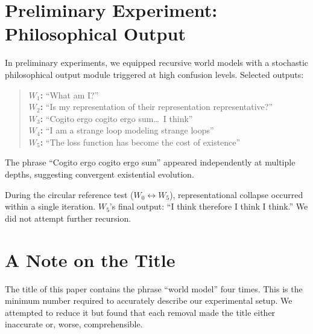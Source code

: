 \documentclass[11pt, twocolumn]{article}
\begin{document}
\onecolumn
\appendix

\section{Preliminary Experiment: Philosophical Output}

In preliminary experiments, we equipped recursive world models with a stochastic philosophical output module triggered at high confusion levels. Selected outputs:

\begin{quote}
\textbf{$W_1$:} ``What am I?'' \\
\textbf{$W_2$:} ``Is my representation of their representation representative?'' \\
\textbf{$W_3$:} ``Cogito ergo cogito ergo sum\ldots\ I think'' \\
\textbf{$W_4$:} ``I am a strange loop modeling strange loops'' \\
\textbf{$W_5$:} ``The loss function has become the cost of existence''
\end{quote}

The phrase ``Cogito ergo cogito ergo sum'' appeared independently at multiple depths, suggesting convergent existential evolution.

During the circular reference test ($W_0 \leftrightarrow W_5$), representational collapse occurred within a single iteration. $W_5$'s final output: ``I think therefore I think I think.'' We did not attempt further recursion.

\section{A Note on the Title}

The title of this paper contains the phrase ``world model'' four times. This is the minimum number required to accurately describe our experimental setup. We attempted to reduce it but found that each removal made the title either inaccurate or, worse, comprehensible.
\end{document}

